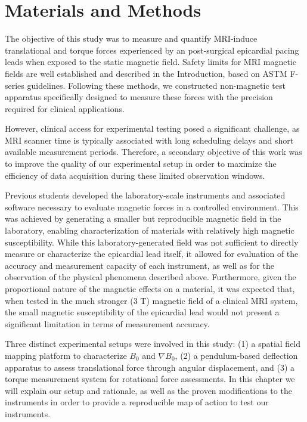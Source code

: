 \chapter {Materials and Methods}

The objective of this study was to measure and quantify MRI-induce translational and torque forces experienced by an  post-surgical epicardial pacing leads when exposed to the static magnetic field. Safety limits for MRI magnetic fields are well established and described in the Introduction, based on ASTM F-series guidelines. Following these methods, we constructed non-magnetic test apparatus specifically designed to measure these forces with the precision required for clinical applications.

However, clinical access for experimental testing posed a significant challenge, as MRI scanner time is typically associated with long scheduling delays and short available measurement periods. Therefore, a secondary objective of this work was to improve the quality of our experimental setup in order to maximize the efficiency of data acquisition during these limited observation windows.

Previous students developed the laboratory-scale instruments and associated software necessary to evaluate magnetic forces in a controlled environment. This was achieved by generating a smaller but reproducible magnetic field in the laboratory, enabling characterization of materials with relatively high magnetic susceptibility. While this laboratory-generated field was not sufficient to directly measure or characterize the epicardial lead itself, it allowed for evaluation of the accuracy and measurement capacity of each instrument, as well as for the observation of the physical phenomena described above. Furthermore, given the proportional nature of the magnetic effects on a material, it was expected that, when tested in the much stronger (3 T) magnetic field of a clinical MRI system, the small magnetic susceptibility of the epicardial lead would not present a significant limitation in terms of measurement accuracy.

Three distinct experimental setups were involved in this study: (1) a spatial field mapping platform to characterize $B_0$ and $\nabla B_0$, (2) a pendulum-based deflection apparatus to assess translational force through angular displacement, and (3) a torque measurement system for rotational force assessments. In this chapter we will explain our setup and rationale, as well as the proven modifications to the instruments in order to provide a reproducible map of action to test our instruments.






